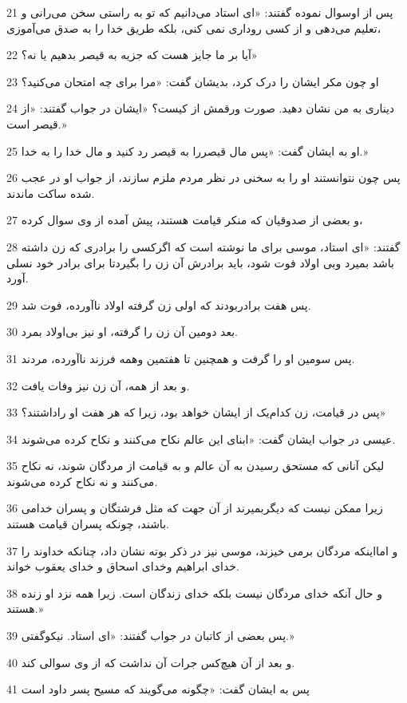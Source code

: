 \par 21 پس از اوسوال نموده گفتند: «ای استاد می‌دانیم که تو به راستی سخن می‌رانی و تعلیم می‌دهی و از کسی روداری نمی کنی، بلکه طریق خدا را به صدق می‌آموزی،
\par 22 آیا بر ما جایز هست که جزیه به قیصر بدهیم یا نه؟»
\par 23 او چون مکر ایشان را درک کرد، بدیشان گفت: «مرا برای چه امتحان می‌کنید؟
\par 24 دیناری به من نشان دهید. صورت ورقمش از کیست؟ «ایشان در جواب گفتند: «از قیصر است.»
\par 25 او به ایشان گفت: «پس مال قیصررا به قیصر رد کنید و مال خدا را به خدا.»
\par 26 پس چون نتوانستند او را به سخنی در نظر مردم ملزم سازند، از جواب او در عجب شده ساکت ماندند.
\par 27 و بعضی از صدوقیان که منکر قیامت هستند، پیش آمده از وی سوال کرده،
\par 28 گفتند: «ای استاد، موسی برای ما نوشته است که اگرکسی را برادری که زن داشته باشد بمیرد وبی اولاد فوت شود، باید برادرش آن زن را بگیردتا برای برادر خود نسلی آورد.
\par 29 پس هفت برادربودند که اولی زن گرفته اولاد ناآورده، فوت شد.
\par 30 بعد دومین آن زن را گرفته، او نیز بی‌اولاد بمرد.
\par 31 پس سومین او را گرفت و همچنین تا هفتمین وهمه فرزند ناآورده، مردند.
\par 32 و بعد از همه، آن زن نیز وفات یافت.
\par 33 پس در قیامت، زن کدام‌یک از ایشان خواهد بود، زیرا که هر هفت او راداشتند؟»
\par 34 عیسی در جواب ایشان گفت: «ابنای این عالم نکاح می‌کنند و نکاح کرده می‌شوند.
\par 35 لیکن آنانی که مستحق رسیدن به آن عالم و به قیامت از مردگان شوند، نه نکاح می‌کنند و نه نکاح کرده می‌شوند.
\par 36 زیرا ممکن نیست که دیگربمیرند از آن جهت که مثل فرشتگان و پسران خدامی باشند، چونکه پسران قیامت هستند.
\par 37 و امااینکه مردگان برمی خیزند، موسی نیز در ذکر بوته نشان داد، چنانکه خداوند را خدای ابراهیم وخدای اسحاق و خدای یعقوب خواند.
\par 38 و حال آنکه خدای مردگان نیست بلکه خدای زندگان است. زیرا همه نزد او زنده هستند.»
\par 39 پس بعضی از کاتبان در جواب گفتند: «ای استاد. نیکوگفتی.»
\par 40 و بعد از آن هیچ‌کس جرات آن نداشت که از وی سوالی کند.
\par 41 پس به ایشان گفت: «چگونه می‌گویند که مسیح پسر داود است
